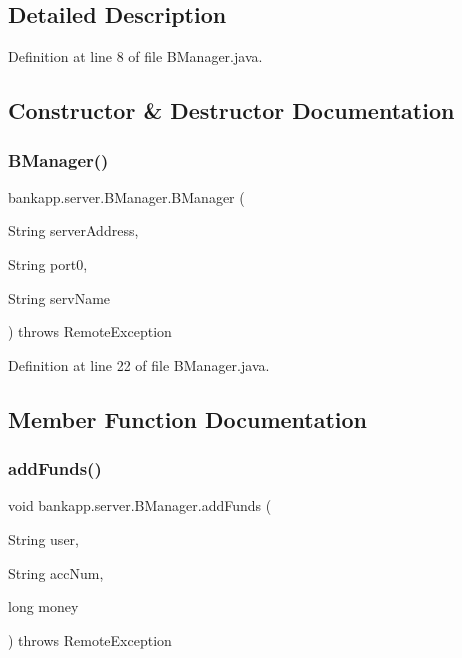 \subsection{Detailed Description}


Definition at line 8 of file B\+Manager.\+java.



\subsection{Constructor \& Destructor Documentation}
\mbox{\label{classbankapp_1_1server_1_1_b_manager_aa7f45d3eddae4e91afaf2b19275b0c7e}} 
\subsubsection{\texorpdfstring{B\+Manager()}{BManager()}}
{\footnotesize\ttfamily bankapp.\+server.\+B\+Manager.\+B\+Manager (\begin{DoxyParamCaption}\item[{String}]{server\+Address,  }\item[{String}]{port0,  }\item[{String}]{serv\+Name }\end{DoxyParamCaption}) throws Remote\+Exception}



Definition at line 22 of file B\+Manager.\+java.



\subsection{Member Function Documentation}
\mbox{\label{classbankapp_1_1server_1_1_b_manager_a0c81d9fb02961e95efa371249f284b47}} 
\subsubsection{\texorpdfstring{add\+Funds()}{addFunds()}}
{\footnotesize\ttfamily void bankapp.\+server.\+B\+Manager.\+add\+Funds (\begin{DoxyParamCaption}\item[{String}]{user,  }\item[{String}]{acc\+Num,  }\item[{long}]{money }\end{DoxyParamCaption}) throws Remote\+Exception}



